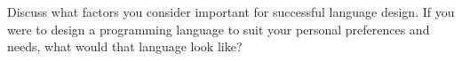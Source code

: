 \documentclass{supervision}
\begin{document}
\begin{questions}
\question Discuss what factors you consider important for successful language design.
\question If you were to design a programming language to suit your personal preferences and needs, what would that language look like?
\end{questions}
\end{document}

